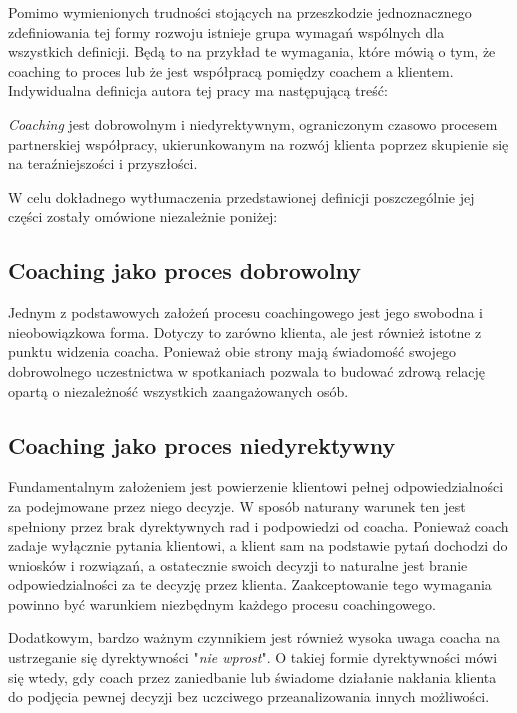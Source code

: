 Pomimo wymienionych trudności stojących na przeszkodzie jednoznacznego zdefiniowania tej formy rozwoju istnieje grupa wymagań wspólnych dla
wszystkich definicji. Będą to na przykład te wymagania, które mówią o tym, że coaching to proces lub że jest współpracą pomiędzy
coachem a klientem. Indywidualna definicja autora tej pracy ma następującą treść:
\begin{defn}
  \emph{Coaching} jest dobrowolnym i niedyrektywnym, ograniczonym czasowo procesem partnerskiej współpracy,
  ukierunkowanym na rozwój klienta poprzez skupienie się na teraźniejszości i przyszłości.
  \label{definicja}
\end{defn}

W celu dokładnego wytłumaczenia przedstawionej definicji poszczególnie jej części zostały omówione niezależnie poniżej:

\subsection{Coaching jako proces dobrowolny}
Jednym z podstawowych założeń procesu coachingowego jest jego swobodna i nieobowiązkowa forma. Dotyczy to zarówno klienta, ale jest
również istotne z punktu widzenia coacha. Ponieważ obie strony mają świadomość swojego dobrowolnego uczestnictwa w spotkaniach pozwala to budować
zdrową relację opartą o niezależność wszystkich zaangażowanych osób.

\subsection{Coaching jako proces niedyrektywny}
Fundamentalnym założeniem jest powierzenie klientowi pełnej odpowiedzialności za podejmowane przez niego decyzje. W sposób naturany
warunek ten jest spełniony przez brak dyrektywnych rad i podpowiedzi od coacha. Ponieważ coach zadaje wyłącznie pytania klientowi,
a klient sam na podstawie pytań dochodzi do wniosków i rozwiązań, a ostatecznie swoich decyzji to naturalne jest branie odpowiedzialności
za te decyzję przez klienta. Zaakceptowanie tego wymagania powinno być warunkiem niezbędnym każdego procesu coachingowego.

Dodatkowym, bardzo ważnym czynnikiem jest również wysoka uwaga coacha na ustrzeganie się dyrektywności "\emph{nie wprost}". O takiej formie
dyrektywności mówi się wtedy, gdy coach przez zaniedbanie lub świadome działanie nakłania klienta do podjęcia pewnej decyzji bez uczciwego przeanalizowania
innych możliwości. \\

